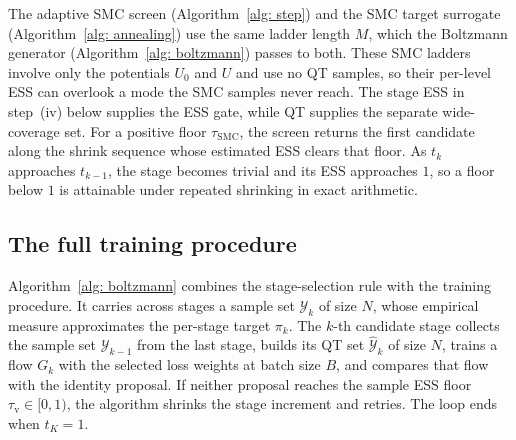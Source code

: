 \documentclass{article}
\begin{document}
The adaptive SMC screen (Algorithm~\ref{alg: step}) and the SMC target surrogate (Algorithm~\ref{alg: annealing}) use the same ladder length $M$, which the Boltzmann generator (Algorithm~\ref{alg: boltzmann}) passes to both. These SMC ladders involve only the potentials $U_0$ and $U$ and use no QT samples, so their per-level ESS can overlook a mode the SMC samples never reach. The stage ESS in step~(iv) below supplies the ESS gate, while QT supplies the separate wide-coverage set. For a positive floor $\tau_{\mathrm{SMC}}$, the screen returns the first candidate along the shrink sequence whose estimated ESS clears that floor. As $t_k$ approaches $t_{k-1}$, the stage becomes trivial and its ESS approaches $1$, so a floor below $1$ is attainable under repeated shrinking in exact arithmetic.


\subsection{The full training procedure}

Algorithm~\ref{alg: boltzmann} combines the stage-selection rule with the training procedure. It carries across stages a sample set $\mathcal Y_k$ of size $N$, whose empirical measure approximates the per-stage target $\pi_k$. The $k$-th candidate stage collects the sample set $\mathcal Y_{k-1}$ from the last stage, builds its QT set $\hat{\mathcal Y}_k$ of size $N$, trains a flow $G_k$ with the selected loss weights at batch size $B$, and compares that flow with the identity proposal. If neither proposal reaches the sample ESS floor $\tau_{\mathrm v}\in[0,1)$, the algorithm shrinks the stage increment and retries. The loop ends when $t_K=1$.
\end{document}
